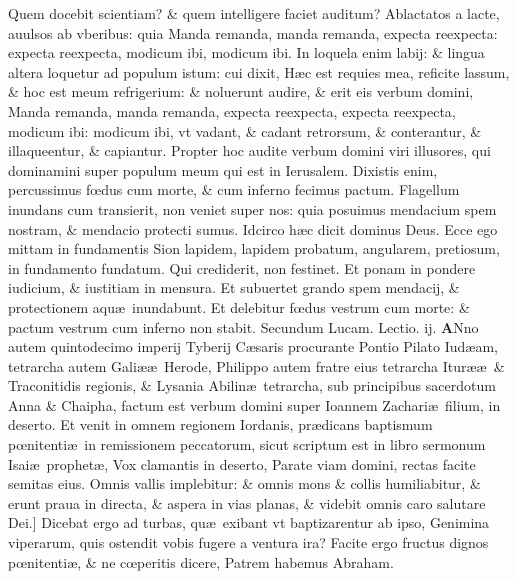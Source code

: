 \documentclass[a5paper,10pt]{book}
\def\rightmarginnote{%
	\lrmarginnote{\hskip\columnwidth \hskip -1em}}
\def\ae{æ}
\def\oe{œ}
\begin{document}
\begin{multicols*}{2}
Quem docebit scientiam? \& quem intelligere faciet auditum?
Ablactatos a lacte, auulsos ab vberibus: quia Manda remanda, manda remanda, expecta reexpecta: expecta reexpecta, modicum ibi, modicum ibi.
In loquela enim labij: \& lingua altera loquetur ad populum istum: cui dixit, H\ae c est requies mea, reficite lassum, \& hoc est meum refrigerium: \& noluerunt audire, \& erit eis verbum domini, Manda remanda, manda remanda, expecta reexpecta, expecta reexpecta, modicum ibi: modicum ibi, vt vadant, \& cadant retrorsum, \& conterantur, \& illaqueentur, \& capiantur.
Propter hoc audite verbum domini viri illusores, qui dominamini super populum meum qui est in Ierusalem.
Dixistis enim, percussimus f\oe dus cum morte, \& cum inferno fecimus pactum.
Flagellum inundans cum transierit, non veniet super nos: quia posuimus mendacium spem nostram, \& mendacio protecti sumus.
Idcirco h\ae c dicit dominus Deus. Ecce ego mittam in fundamentis Sion lapidem,
lapidem probatum, angularem, pretiosum, in fundamento fundatum.
Qui crediderit, non festinet. Et ponam in pondere iudicium, \& iustitiam in mensura. Et subuertet grando spem mendacij, \& protectionem aqu\ae \ inundabunt.
Et delebitur f\oe dus vestrum cum morte: \& pactum vestrum cum inferno non stabit.
\color{red} Secundum Lucam. Lectio. ij. \color{black}
\vspace{-.25em}
\lettrine[lines=2]{\bfseries \color{red} A}{}\textdagger Nno\rightmarginnote{c.3.a} autem quintodecimo imperij Tyberij C\ae saris procurante Pontio Pilato Iud\ae am, tetrarcha autem Gali\ae \ae \ Herode, Philippo autem fratre eius tetrarcha Itur\ae \ae \ \& Traconitidis regionis, \& Lysania Abilin\ae \ tetrarcha, sub principibus sacerdotum Anna \& Chaipha, factum est verbum domini super Ioannem Zachari\ae \ filium, in deserto.
Et venit in omnem regionem Iordanis, pr\ae dicans baptismum p\oe nitenti\ae \ in remissionem peccatorum, sicut scriptum est in libro sermonum Isai\ae \ prophet\ae , Vox clamantis in deserto, Parate viam domini, rectas facite semitas eius.
Omnis vallis implebitur: \& omnis mons \& collis humiliabitur, \& erunt praua in directa, \& aspera in vias planas, \& videbit omnis caro salutare Dei.]
Dicebat\rightmarginnote{B} ergo ad turbas, qu\ae \ exibant vt baptizarentur ab ipso, Genimina viperarum, quis ostendit vobis fugere a ventura ira?
Facite ergo fructus dignos p\oe nitenti\ae , \& ne c\oe peritis dicere, Patrem habemus Abraham.

\end{multicols*}
\end{document}

